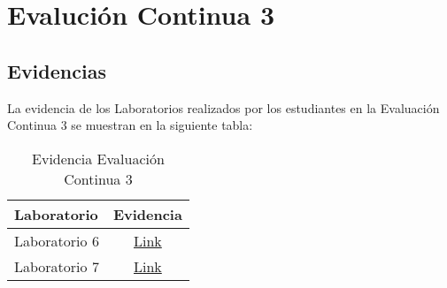 \chapter{Evalución Continua 3}
\newpage



\pagestyle{empty} %

\section{Evidencias}
La evidencia de los Laboratorios realizados por los estudiantes en la Evaluación Continua 3 se muestran en la siguiente tabla:

\begin{table}[h]
\centering
\begin{tabular}{l|c}
\hline
\textbf{Laboratorio} & 
\textbf{Evidencia} 
\\ \hline
Laboratorio 6 &
\href{https://drive.google.com/drive/folders/1uoms3Sf82lClrYDLxP1Al8PQAyQCmEuC?usp=sharing}{Link}
\\ \hline
Laboratorio 7 &
\href{https://drive.google.com/drive/folders/1k54LTmGwlU7G_YXNRZkMFTmEdzDkDSdW?usp=sharing}{Link}
\\ \hline
\end{tabular}
\caption{Evidencia Evaluación Continua 3}
\label{tab:evidencia_evaluacion_continua_3} %
\end{table}


